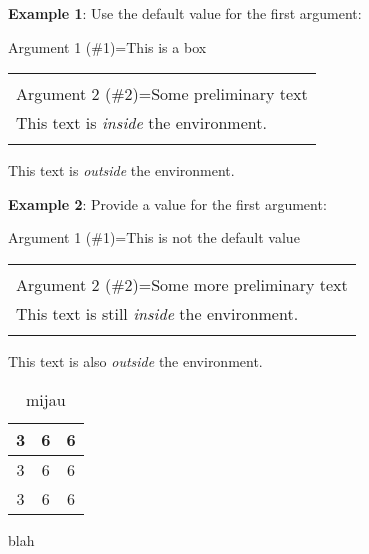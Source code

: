 \documentclass{article}
\newenvironment{mijau}[2][This is a box]
    {\begin{center}
    Argument 1 (\#1)=#1\\[1ex]
    \begin{tabular}{|p{0.9\textwidth}|}
    \hline\\
    Argument 2 (\#2)=#2\\[2ex]
    }
    { 
    \\\\\hline
    \end{tabular} 
    \end{center}
    }
\newenvironment{magic}[3]
    {\begin{table}
    \centering
    \caption{#1}
    \label{#2}
    \begin{tabular}{|*{#3}{c|}}
        \hline
    }
    {\end{tabular}
    \end{table}
    }
\begin{document}
\textbf{Example 1}: Use the default value for the first argument:
 
\begin{mijau}{Some preliminary text}
This text is \textit{inside} the environment.
\end{mijau}

This text is \textit{outside} the environment.

\vskip12pt

\textbf{Example 2}: Provide a value for the first argument:
 
\begin{mijau}[This is not the default value]{Some more preliminary text}
This text is still \textit{inside} the environment.
\end{mijau}

This text is also \textit{outside} the environment.

\begin{magic}{mijau}{tab:3}{3}
    3 & 6 & 6 \\\hline
    3 & 6 & 6 \\\hline
    3 & 6 & 6 \\\hline
\end{magic}
\begin{boxed}
{blah}
\end{boxed}
\end{document}
